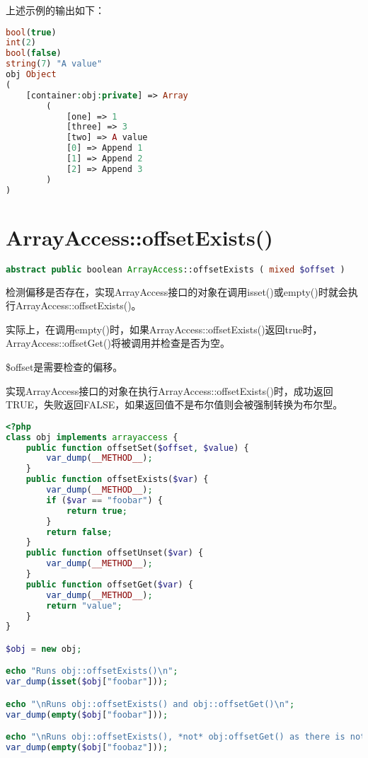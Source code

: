 上述示例的输出如下：

\begin{lstlisting}[language=PHP]
bool(true)
int(2)
bool(false)
string(7) "A value"
obj Object
(
    [container:obj:private] => Array
        (
            [one] => 1
            [three] => 3
            [two] => A value
            [0] => Append 1
            [1] => Append 2
            [2] => Append 3
        )
)
\end{lstlisting}

\section{ArrayAccess::offsetExists()}




\begin{lstlisting}[language=PHP]
abstract public boolean ArrayAccess::offsetExists ( mixed $offset )
\end{lstlisting}

检测偏移是否存在，实现ArrayAccess接口的对象在调用isset()或empty()时就会执行ArrayAccess::offsetExists()。

实际上，在调用empty()时，如果ArrayAccess::offsetExists()返回true时，ArrayAccess::offsetGet()将被调用并检查是否为空。

\$offset是需要检查的偏移。

实现ArrayAccess接口的对象在执行ArrayAccess::offsetExists()时，成功返回TRUE，失败返回FALSE，如果返回值不是布尔值则会被强制转换为布尔型。



\begin{lstlisting}[language=PHP]
<?php
class obj implements arrayaccess {
    public function offsetSet($offset, $value) {
        var_dump(__METHOD__);
    }
    public function offsetExists($var) {
        var_dump(__METHOD__);
        if ($var == "foobar") {
            return true;
        }
        return false;
    }
    public function offsetUnset($var) {
        var_dump(__METHOD__);
    }
    public function offsetGet($var) {
        var_dump(__METHOD__);
        return "value";
    }
}

$obj = new obj;

echo "Runs obj::offsetExists()\n";
var_dump(isset($obj["foobar"]));

echo "\nRuns obj::offsetExists() and obj::offsetGet()\n";
var_dump(empty($obj["foobar"]));

echo "\nRuns obj::offsetExists(), *not* obj:offsetGet() as there is nothing to get\n";
var_dump(empty($obj["foobaz"]));
\end{lstlisting}

